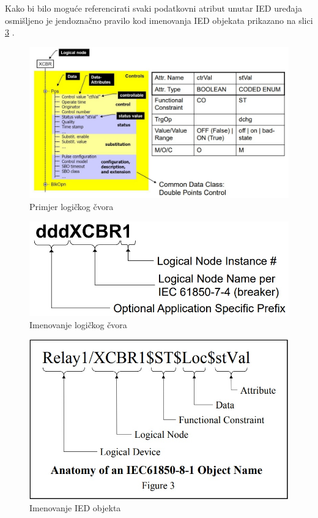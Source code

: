 \documentclass[times, utf8, zavrsni]{fer}
\begin{document}
Kako bi bilo moguće referencirati svaki podatkovni atribut unutar IED uređaja osmišljeno je jendoznačno pravilo kod imenovanja IED objekata prikazano na slici \ref{fig:iec-object-name} \citep{baigent2004iec}.

\begin{figure}[tph]
    \centering
    \includegraphics[scale=0.4]{img/IEC61850-logical-node-xcbr.jpg}
    \caption{Primjer logičkog čvora\footnotemark}
    \label{fig:iec-logical-node-xcbr}
\end{figure}

\begin{figure}[tph]
    \centering
    \includegraphics[scale=0.35]{img/IEC61850-logical-node-name.jpg}
    \caption{Imenovanje logičkog čvora\footnotemark}
    \label{fig:iec-logical-node-name}
\end{figure}

\begin{figure}[bph]
    \centering
    \includegraphics[scale=0.35]{img/IEC61850-object-name.jpg}
    \caption{Imenovanje IED objekta\footnotemark}
    \label{fig:iec-object-name}
\end{figure}
\end{document}
